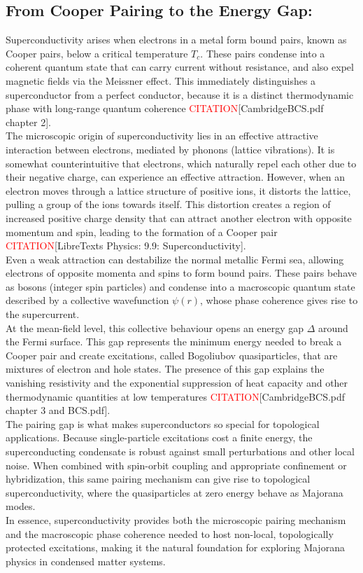 \documentclass[11pt, letterpaper, titlepage]{article}
\begin{document}
\subsection{From Cooper Pairing to the Energy Gap:} 
Superconductivity arises when electrons in a metal form bound pairs, known as Cooper pairs, below a critical temperature $T_c$. These pairs condense into a coherent quantum state that can carry current without resistance, and also expel magnetic fields via the Meissner effect. This immediately distinguishes a superconductor from a perfect conductor, because it is a distinct thermodynamic phase with long-range quantum coherence \textcolor{red}{CITATION}[CambridgeBCS.pdf chapter 2].\\
The microscopic origin of superconductivity lies in an effective attractive interaction between electrons, mediated by phonons (lattice vibrations). It is somewhat counterintuitive that electrons, which naturally repel each other due to their negative charge, can experience an effective attraction. However, when an electron moves through a lattice structure of positive ions, it distorts the lattice, pulling a group of the ions towards itself. This distortion creates a region of increased positive charge density that can attract another electron with opposite momentum and spin, leading to the formation of a Cooper pair \textcolor{red}{CITATION}[LibreTexts Physics: 9.9: Superconductivity].\\
Even a weak attraction can destabilize the normal metallic Fermi sea, allowing electrons of opposite momenta and spins to form bound pairs. These pairs behave as bosons (integer spin particles) and condense into a macroscopic quantum state described by a collective wavefunction $ψ(r)$, whose phase coherence gives rise to the supercurrent.\\ 
At the mean-field level, this collective behaviour opens an energy gap $Δ$ around the Fermi surface. This gap represents the minimum energy needed to break a Cooper pair and create excitations, called Bogoliubov quasiparticles, that are mixtures of electron and hole states. The presence of this gap explains the vanishing resistivity and the exponential suppression of heat capacity and other thermodynamic quantities at low temperatures \textcolor{red}{CITATION}[CambridgeBCS.pdf chapter 3 and BCS.pdf].\\
The pairing gap is what makes superconductors so special for topological applications. Because single-particle excitations cost a finite energy, the superconducting condensate is robust against small perturbations and other local noise. When combined with spin-orbit coupling and appropriate confinement or hybridization, this same pairing mechanism can give rise to topological superconductivity, where the quasiparticles at zero energy behave as Majorana modes.\\
In essence, superconductivity provides both the microscopic pairing mechanism and the macroscopic phase coherence needed to host non-local, topologically protected excitations, making it the natural foundation for exploring Majorana physics in condensed matter systems.
\end{document}

